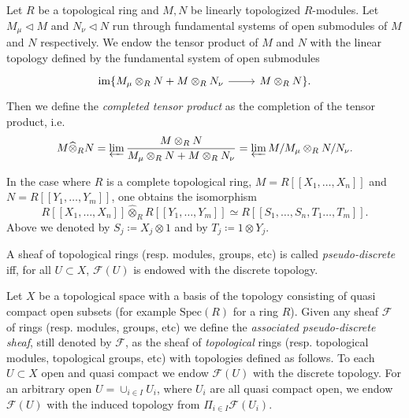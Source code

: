 \begin{defn}
	Let $R$ be a topological ring and $M, N$ be linearly topologized $R$-modules.
	Let $M_\mu \triangleleft M$ and $N_\nu \triangleleft N$ run through
	fundamental systems of open submodules of $M$ and $N$ respectively.
	We endow the tensor product of $M$ and $N$ with the linear topology
	defined by the fundamental system of open submodules
	\begin{equation*}
	\begin{tikzcd}
	\ima \{ M_\mu \otimes_R N + M \otimes_R N_\nu 
		\arrow[r, "", rightarrow] &
	M \otimes_R N \}
	.\end{tikzcd}
	\end{equation*}
	Then we define the {\em completed tensor product} as the completion
	of the tensor product, i.e.
	\begin{equation*}
		M \widehat{\otimes}_R N = 
		\varprojlim \frac{M \otimes_R N}{M_\mu \otimes_R N +
		M \otimes_R N_\nu} =
		\varprojlim M / M_\mu \otimes_R N / N_\nu
	.\end{equation*}
\end{defn}


\begin{rem}[]
	In the case where $R$ is a complete topological ring,
	$M = R [\![ X_1, \ldots, X_{ n } ]\!]$
	and $N = R [\![ Y_1, \ldots, Y_{ m } ]\!]$,
	one obtains the isomorphism
	\begin{equation*}
		R [\![ X_1, \ldots, X_{ n } ]\!] \widehat{\otimes}_R
		R [\![ Y_1, \ldots, Y_{ m } ]\!] \simeq
		R [\![ S_1, \ldots, S_n, T_1 \ldots, T_{ m } ]\!]
	.\end{equation*}
	Above we denoted by $S_j \coloneqq X_j \otimes 1$
	and by $T_j \coloneqq 1 \otimes Y_j$.
\end{rem}


\begin{defn}
	A sheaf of topological rings (resp$.$ modules, groups, etc)
	is called {\em pseudo-discrete} iff, for all $U \subset X$,
	$\mathcal{F}(U)$ is endowed with the discrete topology.
\end{defn}


\begin{defn}\label{defn:AssociatePDSheaf}
	Let $X$ be a topological space with a basis of the topology
	consisting of quasi compact open subsets (for example $\mathrm{Spec}(R)$
	for a ring $R$).
	Given any sheaf $\mathcal{F}$ of rings (resp$.$ modules, groups, etc)
	we define the {\em associated pseudo-discrete sheaf},
	still denoted by $\mathcal{F}$, as the sheaf
	of {\em topological} rings (resp$.$ topological modules, topological groups, etc)
	with topologies defined as follows.
	To each $U \subset X$ open and quasi compact we endow
	$\mathcal{F}(U)$ with the discrete topology.
	For an arbitrary open $U = \cup_{i \in I} U_i$, where $U_i$ are all
	quasi compact open, we endow $\mathcal{F}(U)$ with the
	induced topology from $\Pi_{i \in I} \mathcal{F}(U_i)$.
\end{defn}


